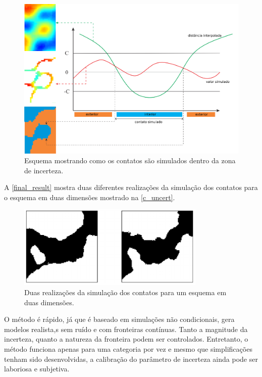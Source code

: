 \begin{figure}[H]
	\caption{\label{conceptual}Esquema mostrando como os contatos são simulados dentro da zona de incerteza.}
	\centering
		\includegraphics[width=\textwidth]{capitulo_2/imagens/conceptual.png}
\end{figure}

A \autoref{final_result} mostra duas diferentes realizações da simulação dos contatos para o esquema em duas dimensões mostrado na \autoref{c_uncert}.

\begin{figure}[H]
	\caption{\label{final_result}Duas realizações da simulação dos contatos para um esquema em duas dimensões.}
	\centering
		\includegraphics[width=0.8\textwidth]{capitulo_2/imagens/final result.png}
\end{figure}

O método é rápido, já que é baseado em simulações não condicionais, gera modelos realista,s sem ruído e com fronteiras contínuas. Tanto a magnitude da incerteza, quanto a natureza da fronteira podem ser controlados. Entretanto, o método funciona apenas para uma categoria por vez e mesmo que simplificações tenham sido desenvolvidas, a calibração do parâmetro de incerteza ainda pode ser laboriosa e subjetiva.